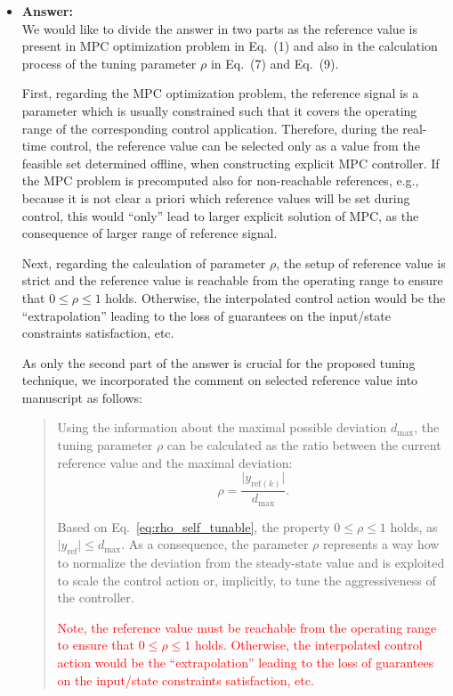 \documentclass[a4paper,10pt]{article}
\newcommand{\change}[1]{\textcolor{red}{#1}}
\newcommand{\answer}[1]{
	\begin{itemize}
		\item[] \textbf{Answer:}\\ #1
	\end{itemize}
}
\begin{document}
	\answer{
		We would like to divide the answer in two parts as the reference value is present in MPC optimization problem in Eq.~(1) and also in the calculation process of the tuning parameter $\rho$ in Eq.~(7) and Eq.~(9). 
		
		First, regarding the MPC optimization problem, the reference signal is a parameter which is usually constrained such that it covers the operating range of the corresponding control application. Therefore, during the real-time control, the reference value can be selected only as a value from the feasible set determined offline, when constructing explicit MPC controller. If the MPC problem is precomputed also for non-reachable references, e.g., because it is not clear a priori which reference values will be set during control, this would ``only'' lead to larger explicit solution of MPC, as the consequence of larger range of reference signal. 

		Next, regarding the calculation of parameter $\rho$, the setup of reference value is strict and the reference value is reachable from the operating range to ensure that $0 \le \rho \le 1 $ holds. Otherwise, the interpolated control action would be the ``extrapolation'' leading to the loss of guarantees on the input/state constraints satisfaction, etc.	
		
		As only the second part of the answer is crucial for the proposed tuning technique, we incorporated the comment on selected reference value into manuscript as follows:	
		
			\begin{quote}
				Using the information about the maximal possible deviation $d_{\max}$, the tuning parameter $\rho$ can be calculated as the ratio between the current reference value and the maximal deviation:  
				\begin{equation} \tag{7}
					\label{eq:rho_self_tunable}
					\rho = \frac{\vert y_{\mathrm{ref}(k)} \vert}{d_{\max}}.
				\end{equation}
				
				Based on Eq.~\eqref{eq:rho_self_tunable}, the property $0 \le \rho \le 1$ holds, as $\vert y_{\mathrm{ref}} \vert \le d_{\max}$. As a consequence, the parameter $\rho$ represents a way how to normalize the deviation from the steady-state value and is exploited to scale the control action or, implicitly, to tune the aggressiveness of the controller. 
				
				\change{Note, the reference value must be reachable from the operating range to ensure that $0 \le \rho \le 1 $ holds. Otherwise, the interpolated control action would be the ``extrapolation'' leading to the loss of guarantees on the input/state constraints satisfaction, etc.}
			\end{quote}
	}
\end{document}
